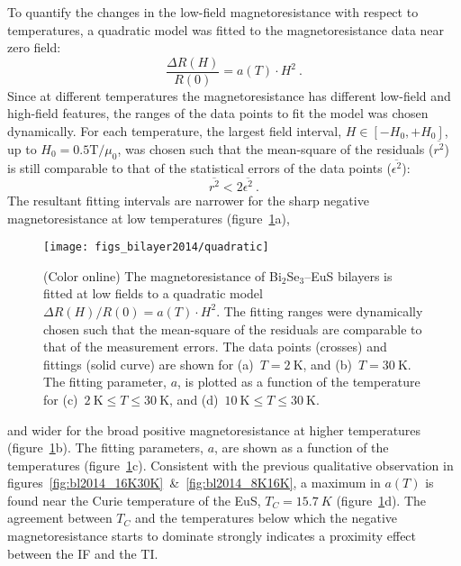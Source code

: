 To quantify the changes in the low-field magnetoresistance with respect to temperatures, a quadratic model was fitted to the magnetoresistance data near zero field:%
\begin{equation}\label{eq:bl2014_quadratic}%
    \frac{\Delta R(H)}{R(0)} = a(T)\cdot H^2~.%
\end{equation}%
Since at different temperatures the magnetoresistance has different low-field and high-field features, the ranges of the data points to fit the model was chosen dynamically. For each temperature, the largest field interval, $H \in [-H_0, +H_0]$, up to $H_0 = 0.5 \mathrm{T}/\mu_0$, was chosen such that the mean-square of the residuals ($\overline{r^2}$) is still comparable to that of the statistical errors of the data points ($\overline{\epsilon^2}$):
\begin{equation}
    \overline{r^2} < 2\overline{\epsilon^2}~.%
\end{equation}%
The resultant fitting intervals are narrower for the sharp negative magnetoresistance at low temperatures (figure~\ref{fig:bl2014_quadratic}a),%
%
\begin{figure}[ht]%
    \centering%
    \texttt{[image: figs\_bilayer2014/quadratic]}%
    \caption[Quadratic fittings to the magnetoresistance of Bi$_2$Se$_3$--EuS bilayers]{\label{fig:bl2014_quadratic}(Color online) The magnetoresistance of Bi$_2$Se$_3$--EuS bilayers is fitted at low fields to a quadratic model $\Delta R(H) / R(0) = a(T)\cdot H^2$. The fitting ranges were dynamically chosen such that the mean-square of the residuals are comparable to that of the measurement errors. The data points (crosses) and fittings (solid curve) are shown for (a)~$T=2~\mathrm{K}$, and (b)~$T=30~\mathrm{K}$. The fitting parameter, $a$, is plotted as a function of the temperature for (c)~$2~\mathrm{K} \leq T \leq 30~\mathrm{K}$, and (d)~$10~\mathrm{K} \leq T \leq 30~\mathrm{K}$.}%
\end{figure} %
%
and wider for the broad positive magnetoresistance at higher temperatures (figure~\ref{fig:bl2014_quadratic}b). The fitting parameters, $a$, are shown as a function of the temperatures (figure~\ref{fig:bl2014_quadratic}c). Consistent with the previous qualitative observation in figures~\ref{fig:bl2014_16K30K}~\&~\ref{fig:bl2014_8K16K}, a maximum in $a(T)$ is found near the Curie temperature of the EuS, $T_C = \SI{15.7}{K}$ (figure~\ref{fig:bl2014_quadratic}d). The agreement between $T_C$ and the temperatures below which the negative magnetoresistance starts to dominate strongly indicates a proximity effect between the IF and the TI.

